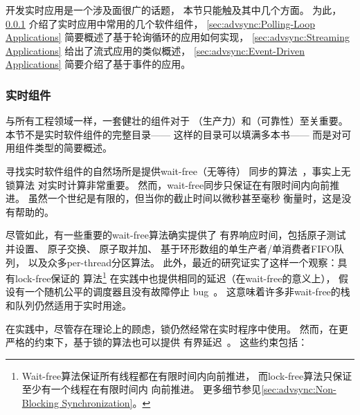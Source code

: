 开发实时应用是一个涉及面很广的话题，
本节只能触及其中几个方面。
为此，
\cref{sec:advsync:Real-Time Components}
介绍了实时应用中常用的几个软件组件，
\cref{sec:advsync:Polling-Loop Applications}
简要概述了基于轮询循环的应用如何实现，
\cref{sec:advsync:Streaming Applications}
给出了流式应用的类似概述，
\cref{sec:advsync:Event-Driven Applications}
简要介绍了基于事件的应用。

\subsubsection{实时组件}
\label{sec:advsync:Real-Time Components}

与所有工程领域一样，一套健壮的组件对于
（生产力）和（可靠性）至关重要。
本节不是实时软件组件的完整目录——
这样的目录可以填满多本书——
而是对可用组件类型的简要概述。

寻找实时软件组件的自然场所是提供wait-free（无等待）
同步的算法~\cite{Herlihy91}，事实上无锁算法
对实时计算非常重要。
然而，wait-free同步只保证在有限时间内向前推进。
虽然一个世纪是有限的，但当你的截止时间以微秒甚至毫秒
衡量时，这是没有帮助的。

尽管如此，有一些重要的wait-free算法确实提供了
有界响应时间，包括原子测试并设置、
原子交换、
原子取并加、
基于环形数组的单生产者/单消费者FIFO队列，
以及众多per-thread分区算法。
此外，最近的研究证实了这样一个观察：具有lock-free保证的
算法\footnote{
	Wait-free算法保证所有线程都在有限时间内向前推进，
	而lock-free算法只保证至少有一个线程在有限时间内
	向前推进。
	更多细节参见\cref{sec:advsync:Non-Blocking Synchronization}。}
在实践中也提供相同的延迟（在wait-free的意义上），
假设有一个随机公平的调度器且没有故障停止
bug~\cite{DanAlitarh2013PracticalProgress}。
这意味着许多非wait-free的栈和队列仍然适用于实时用途。

\QuickQuizEnd

在实践中，尽管存在理论上的顾虑，锁仍然经常在实时程序中使用。
然而，在更严格的约束下，基于锁的算法也可以提供
有界延迟~\cite{BjoernBrandenburgPhD}。
这些约束包括：

